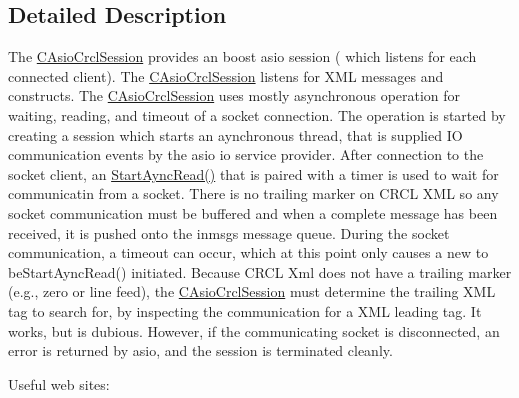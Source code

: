 \subsection{Detailed Description}
The \hyperlink{classCAsioCrclSession}{C\-Asio\-Crcl\-Session} provides an boost asio session ( which listens for each connected client). The \hyperlink{classCAsioCrclSession}{C\-Asio\-Crcl\-Session} listens for X\-M\-L messages and constructs. The \hyperlink{classCAsioCrclSession}{C\-Asio\-Crcl\-Session} uses mostly asynchronous operation for waiting, reading, and timeout of a socket connection. The operation is started by creating a session which starts an aynchronous thread, that is supplied I\-O communication events by the asio io service provider. After connection to the socket client, an \hyperlink{classCAsioCrclSession_ac7e0900916ab6de40bf546116d5e6d3e}{Start\-Aync\-Read()} that is paired with a timer is used to wait for communicatin from a socket. There is no trailing marker on C\-R\-C\-L X\-M\-L so any socket communication must be buffered and when a complete message has been received, it is pushed onto the inmsgs message queue. During the socket communication, a timeout can occur, which at this point only causes a new to be\-Start\-Aync\-Read() initiated. Because C\-R\-C\-L Xml does not have a trailing marker (e.\-g., zero or line feed), the \hyperlink{classCAsioCrclSession}{C\-Asio\-Crcl\-Session} must determine the trailing X\-M\-L tag to search for, by inspecting the communication for a X\-M\-L leading tag. It works, but is dubious. However, if the communicating socket is disconnected, an error is returned by asio, and the session is terminated cleanly. \par
 Useful web sites\-: 

